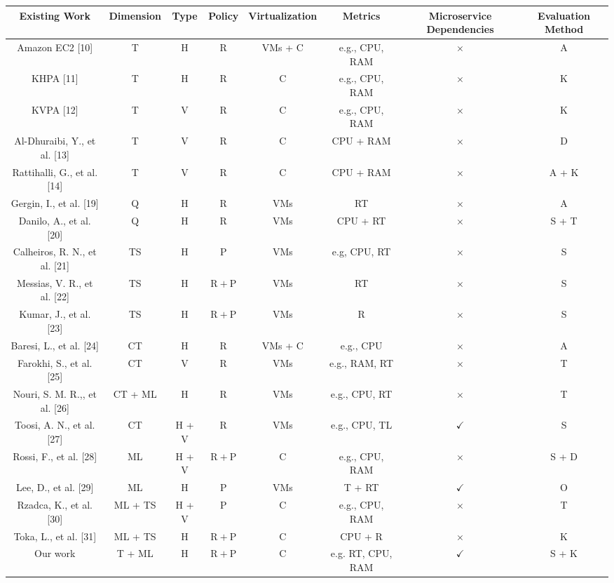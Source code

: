 \documentclass[10pt]{article}
\begin{document}
\begin{center}
\begin{tabular}{|c|c|c|c|c|c|c|c|}
\hline
Existing Work & Dimension & Type & Policy & Virtualization & Metrics & Microservice Dependencies & Evaluation Method \\
\hline
Amazon EC2 [10] & T & H & R & VMs + C & e.g., CPU, RAM & $\times$ & A \\
\hline
KHPA [11] & T & H & R & C & e.g., CPU, RAM & $\times$ & K \\
\hline
KVPA [12] & T & V & R & C & e.g., CPU, RAM & $\times$ & K \\
\hline
Al-Dhuraibi, Y., et al. [13] & T & V & R & C & CPU + RAM & $\times$ & D \\
\hline
Rattihalli, G., et al. [14] & T & V & R & C & CPU + RAM & $\times$ & A + K \\
\hline
Gergin, I., et al. [19] & Q & H & R & VMs & RT & $\times$ & A \\
\hline
Danilo, A., et al. [20] & Q & H & R & VMs & CPU + RT & $\times$ & S + T \\
\hline
Calheiros, R. N., et al. [21] & TS & H & P & VMs & e.g, CPU, RT & $\times$ & S \\
\hline
Messias, V. R., et al. [22] & TS & H & $\mathrm{R}+\mathrm{P}$ & VMs & RT & $\times$ & S \\
\hline
Kumar, J., et al. [23] & TS & H & $\mathrm{R}+\mathrm{P}$ & VMs & R & $\times$ & S \\
\hline
Baresi, L., et al. [24] & CT & H & R & VMs + C & e.g., CPU & $\times$ & A \\
\hline
Farokhi, S., et al. [25] & CT & V & R & VMs & e.g., RAM, RT & $\times$ & T \\
\hline
Nouri, S. M. R.,, et al. [26] & CT + ML & H & R & VMs & e.g., CPU, RT & $\times$ & T \\
\hline
Toosi, A. N., et al. [27] & CT & H + V & R & VMs & e.g., CPU, TL & $\checkmark$ & S \\
\hline
Rossi, F., et al. [28] & ML & H + V & $\mathrm{R}+\mathrm{P}$ & C & e.g., CPU, RAM & $\times$ & S + D \\
\hline
Lee, D., et al. [29] & ML & H & P & VMs & T + RT & $\checkmark$ & O \\
\hline
Rzadca, K., et al. [30] & ML + TS & H + V & P & C & e.g., CPU, RAM & $\times$ & T \\
\hline
Toka, L., et al. [31] & ML + TS & H & $\mathrm{R}+\mathrm{P}$ & C & CPU + R & $\times$ & K \\
\hline
Our work & T + ML & H & $\mathrm{R}+\mathrm{P}$ & C & e.g. RT, CPU, RAM & $\checkmark$ & S + K \\
\hline
\end{tabular}
\end{center}
\end{document}

